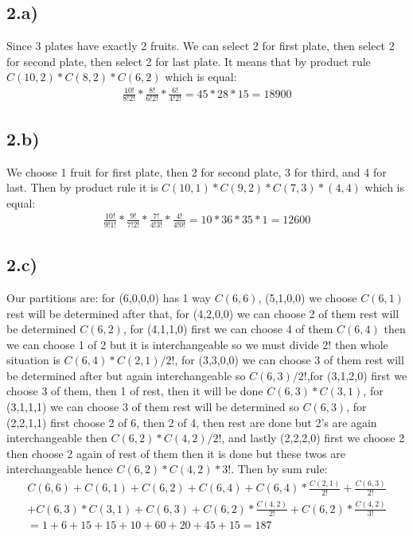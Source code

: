 \documentclass[12pt]{article}
\begin{document}
\subsection*{2.a)}
Since 3 plates have exactly 2 fruits. We can select 2 for first plate, then select 2 for second plate, then select 2 for last plate. It means that by product rule $C(10,2)*C(8,2)*C(6,2)$ which is equal:
\begin{equation} 
\begin{split} 
   \frac{10!}{8!2!} * \frac{8!}{6!2!}* \frac{6!}{4!2!} = 45*28*15 = 18900
\end{split}
\end{equation} 
\subsection*{2.b)}
We choose 1 fruit for first plate, then 2 for second plate, 3 for third, and 4 for last. Then by product rule it is $C(10,1)*C(9,2)*C(7,3)*(4,4)$ which is equal:
\begin{equation} 
\begin{split} 
   \frac{10!}{9!1!} * \frac{9!}{7!2!}* \frac{7!}{4!3!} *\frac{4!}{4!0!}= 10*36*35*1 = 12600
\end{split}
\end{equation}
\subsection*{2.c)}
Our partitions are: for (6,0,0,0) has 1 way $C(6,6)$, (5,1,0,0) we choose $C(6,1)$ rest will be determined after that, for (4,2,0,0) we can choose 2 of them rest will be determined $C(6,2)$, for (4,1,1,0) first we can choose  4 of them $C(6,4)$ then we can choose 1 of 2 but it is interchangeable so we must divide 2! then whole situation is $C(6,4)*C(2,1)/2!$, for (3,3,0,0) we can choose 3 of them rest will be determined after but again interchangeable so $C(6,3)/2!$,for (3,1,2,0) first we choose 3 of them, then 1 of rest, then it will be done $C(6,3)*C(3,1)$, for (3,1,1,1) we can choose 3 of them rest will be determined so $C(6,3)$, for (2,2,1,1) first choose 2 of 6, then 2 of 4, then rest are done but 2's are again interchangeable then $C(6,2)*C(4,2)/2!$, and lastly (2,2,2,0) first we choose 2 then choose 2 again of rest of them then it is done but these twos are interchangeable hence $C(6,2)*C(4,2)*3!$. Then by sum rule:
\begin{equation} 
\begin{split} 
    C(6,6)+C(6,1)+C(6,2)+C(6,4)+C(6,4)*\frac{C(2,1)}{2!}+\frac{C(6,3)}{2!}\\+C(6,3)*C(3,1)+C(6,3) +C(6,2)*\frac{C(4,2)}{2!}+C(6,2)*\frac{C(4,2)}{3!}\\=1+6+15+15+10+60+20+45+15=187
\end{split}
\end{equation}
\end{document}
